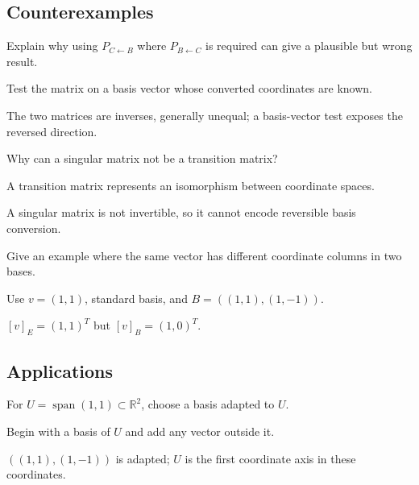 \subsection*{Counterexamples}

\begin{exercise}\label{exr:i04-expand-10}
Explain why using \(P_{C\leftarrow B}\) where \(P_{B\leftarrow C}\) is required can give a plausible but wrong result.
\end{exercise}
\begin{hint}
Test the matrix on a basis vector whose converted coordinates are known.
\end{hint}
\begin{solution}
The two matrices are inverses, generally unequal; a basis-vector test exposes the reversed direction.
\end{solution}

\begin{exercise}\label{exr:i04-expand-11}
Why can a singular matrix not be a transition matrix?
\end{exercise}
\begin{hint}
A transition matrix represents an isomorphism between coordinate spaces.
\end{hint}
\begin{solution}
A singular matrix is not invertible, so it cannot encode reversible basis conversion.
\end{solution}

\begin{exercise}\label{exr:i04-expand-12}
Give an example where the same vector has different coordinate columns in two bases.
\end{exercise}
\begin{hint}
Use \(v=(1,1)\), standard basis, and \(B=((1,1),(1,-1))\).
\end{hint}
\begin{solution}
\([v]_E=(1,1)^T\) but \([v]_B=(1,0)^T\).
\end{solution}

\subsection*{Applications}

\begin{exercise}\label{exr:i04-expand-13}
For \(U=\operatorname{span}(1,1)\subset\mathbb R^2\), choose a basis adapted to \(U\).
\end{exercise}
\begin{hint}
Begin with a basis of \(U\) and add any vector outside it.
\end{hint}
\begin{solution}
\(((1,1),(1,-1))\) is adapted; \(U\) is the first coordinate axis in these coordinates.
\end{solution}

